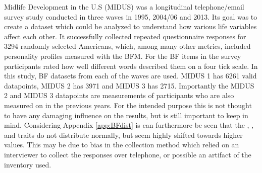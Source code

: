 Midlife Development in the U.S (MIDUS) was a longitudinal telephone/email survey study conducted in three waves in 1995, 2004/06 and 2013. Its goal was to create a dataset which could be analyzed to understand how various life variables affect each other. It successfully collected repeated questionnaire responses for 3294 randomly selected Americans, which, among many other metrics, included personality profiles measured with the BFM. For the BF items in the survey participants rated how well different words described them on a four tick scale.
In this study, BF datasets from each of the waves are used. MIDUS 1 has 6261 valid datapoints, MIDUS 2 has 3971 and MIDUS 3 has 2715. Importantly the MIDUS 2 and MIDUS 3 datapoints are measurements of participants who are also measured on in the previous years. For the intended purpose this is not thought to have any damaging influence on the results, but is still important to keep in mind. Considering Appendix \ref{app:BFdist} is can furthermore be seen that the \CON, \EXT, and \AGR traits do not distribute normally, but seem highly shifted towards higher values. This may be due to bias in the collection method which relied on an interviewer to collect the responses over telephone, or possible an artifact of the inventory used.